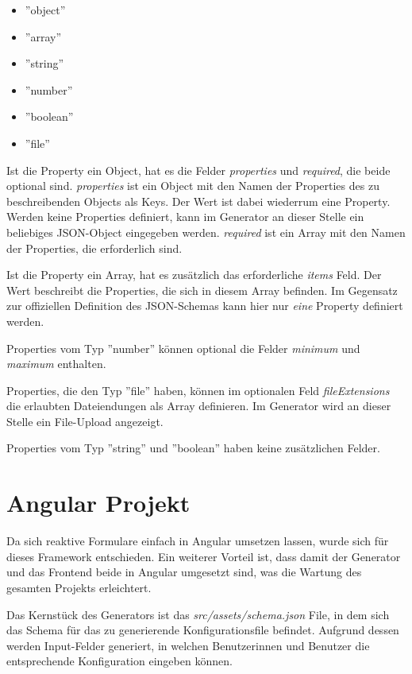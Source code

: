 \begin{itemize}
    \item ''object''
    \item ''array''
    \item ''string''
    \item ''number''
    \item ''boolean''
    \item ''file''
\end{itemize}

Ist die Property ein Object, hat es die Felder \textit{properties} und \textit{required}, die beide optional sind.
\textit{properties} ist ein Object mit den Namen der Properties des zu beschreibenden Objects als Keys.
Der Wert ist dabei wiederrum eine Property.
Werden keine Properties definiert, kann im Generator an dieser Stelle ein beliebiges JSON-Object eingegeben werden.
\textit{required} ist ein Array mit den Namen der Properties, die erforderlich sind.

Ist die Property ein Array, hat es zusätzlich das erforderliche \textit{items} Feld.
Der Wert beschreibt die Properties, die sich in diesem Array befinden.
Im Gegensatz zur offiziellen Definition des JSON-Schemas kann hier nur \textit{eine} Property definiert werden.

Properties vom Typ ''number'' können optional die Felder \textit{minimum} und \textit{maximum} enthalten.

Properties, die den Typ ''file'' haben, können im optionalen Feld \textit{fileExtensions} die erlaubten
Dateiendungen als Array definieren.
Im Generator wird an dieser Stelle ein File-Upload angezeigt.

Properties vom Typ ''string'' und ''boolean'' haben keine zusätzlichen Felder.


\section{Angular Projekt}
Da sich reaktive Formulare einfach in Angular umsetzen lassen, wurde sich für dieses Framework entschieden.
Ein weiterer Vorteil ist, dass damit der Generator und das Frontend beide in Angular umgesetzt sind, was die
Wartung des gesamten Projekts erleichtert.

Das Kernstück des Generators ist das \textit{src/assets/schema.json} File, in dem sich das Schema für das zu
generierende Konfigurationsfile befindet.
Aufgrund dessen werden Input-Felder generiert, in welchen Benutzerinnen und Benutzer die entsprechende
Konfiguration eingeben können.

